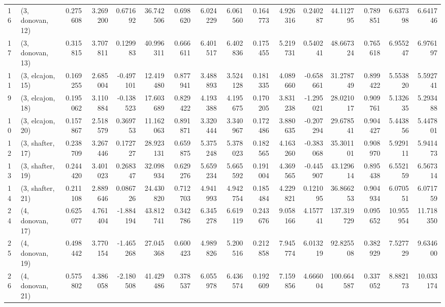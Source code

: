 \begin{tabular}{llrrrrrrrrrrrrrr}
16 &  (3, donovan, 12) &   0.275608 &  3.269200 &  0.671692 &  36.742506 &  0.698620 &   6.024229 &  6.061560 &  0.164773 &  4.926316 &  0.240287 &   44.112795 &  0.789851 &   6.637398 &   6.641746 \\
17 &  (3, donovan, 13) &   0.315815 &  3.707811 &  0.129983 &  40.996311 &  0.666611 &   6.401517 &  6.402836 &  0.175455 &  5.219731 &  0.540241 &   48.667324 &  0.765618 &   6.955247 &   6.976197 \\
11 &  (3, elcajon, 15) &   0.169255 &  2.685004 & -0.497101 &  12.419480 &  0.877941 &   3.488893 &  3.524128 &  0.181335 &  4.089660 & -0.658661 &   31.278749 &  0.899422 &   5.553820 &   5.592741 \\
9  &  (3, elcajon, 18) &   0.195062 &  3.110884 & -0.138523 &  17.603689 &  0.829422 &   4.193388 &  4.195675 &  0.170205 &  3.831238 & -1.295021 &   28.021017 &  0.909761 &   5.132635 &   5.293488 \\
10 &  (3, elcajon, 20) &   0.157867 &  2.518579 &  0.369753 &  11.162063 &  0.891871 &   3.320444 &  3.340967 &  0.172486 &  3.880635 & -0.207294 &   29.678541 &  0.904427 &   5.443856 &   5.447801 \\
12 &  (3, shafter, 17) &   0.238709 &  3.267446 &  0.172727 &  28.923131 &  0.659875 &   5.375248 &  5.378023 &  0.182565 &  4.163260 & -0.383068 &   35.301101 &  0.908970 &   5.929111 &   5.941473 \\
13 &  (3, shafter, 19) &   0.244420 &  3.401023 &  0.268347 &  32.098934 &  0.629276 &   5.659234 &  5.665592 &  0.191004 &  4.369565 & -0.445907 &   43.129614 &  0.895438 &   6.552159 &   6.567314 \\
14 &  (3, shafter, 21) &   0.211108 &  2.889646 &  0.086726 &  24.430820 &  0.712703 &   4.941993 &  4.942754 &  0.185484 &  4.229821 &  0.121095 &   36.866253 &  0.904934 &   6.070551 &   6.071759 \\
24 &  (4, donovan, 17) &   0.625077 &  4.761404 & -1.884194 &  43.812741 &  0.342786 &   6.345278 &  6.619119 &  0.243676 &  9.058166 &  4.157741 &  137.319729 &  0.095652 &  10.955954 &  11.718350 \\
25 &  (4, donovan, 19) &   0.498442 &  3.770154 & -1.465268 &  27.045368 &  0.600423 &   4.989826 &  5.200516 &  0.212858 &  7.945774 &  6.013219 &   92.825508 &  0.382929 &   7.527729 &   9.634600 \\
26 &  (4, donovan, 21) &   0.575802 &  4.386058 & -2.180508 &  41.429486 &  0.378537 &   6.055978 &  6.436574 &  0.192609 &  7.159856 &  4.666004 &  100.664587 &  0.337052 &   8.882173 &  10.033174 \\

\end{tabular}
